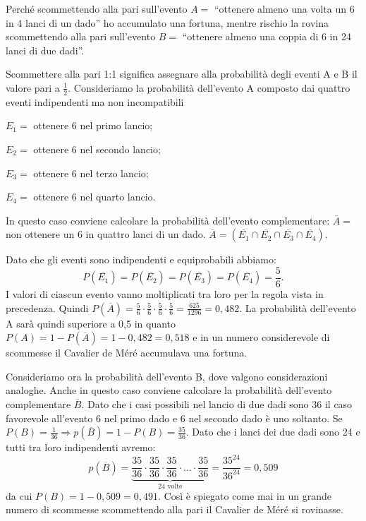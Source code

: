 \begin{problema}
Perché scommettendo alla pari sull'evento $ A= $ ``ottenere almeno una 
volta un 6 in 4 lanci di un dado'' ho accumulato una fortuna, mentre rischio 
la rovina scommettendo alla pari sull'evento $ B= $ ``ottenere almeno una 
coppia di 6 in 24 lanci di due dadi''.
\end{problema}
Scommettere alla pari 1:1 significa assegnare alla probabilità degli eventi 
A e 
B il valore pari a $\frac 1 2$.
Consideriamo la probabilità dell'evento A composto dai quattro eventi 
indipendenti ma non incompatibili
\begin{itemize*}
\item $ E_1= $ ottenere 6 nel primo lancio;
\item $ E_{2}= $ ottenere 6 nel secondo lancio;
\item $ E_{3}= $ ottenere 6 nel terzo lancio;
\item $ E_{4}= $ ottenere 6 nel quarto lancio.
\end{itemize*}
In questo caso conviene calcolare la probabilità dell'evento complementare: 
$\overline A=$ non ottenere un 6 in quattro lanci di un dado.
$\overline A=(\overline{E_1}\cap \overline{E_2}\cap \overline{E_3}\cap 
\overline{E_4})$.

Dato che gli eventi sono indipendenti e equiprobabili abbiamo: \[ 
P(\overline{E_1})=P(\overline{E_2})=P(\overline{E_3})=P(\overline{E_4}
)=\frac 5 
6. \]
I valori di ciascun evento vanno moltiplicati tra loro per la regola vista 
in 
precedenza. Quindi $P(\overline A)=\frac 5 6\cdot \frac 5 6\cdot \frac 5 
6\cdot 
\frac 5 6=\frac{625}{1296}=0,482$.
La probabilità dell'evento A sarà quindi superiore a 0,5 in quanto 
$P(A)=1-P(\overline A)=1-0,482=0,518$ e in un numero considerevole di 
scommesse 
il Cavalier de Méré accumulava una fortuna.

Consideriamo ora la probabilità dell'evento B, dove valgono considerazioni 
analoghe. Anche in questo caso conviene calcolare la probabilità 
dell'evento 
complementare $\overline B$. Dato che i casi possibili nel lancio di due 
dadi 
sono 36 il caso favorevole all'evento 6 nel primo dado e 6 nel secondo dado 
è 
uno soltanto. Se $P(B)=\frac 1{36} \Rightarrow p(\overline 
B)=1-P(B)=\frac{35}{36}$. Dato che i lanci dei due dadi sono 24 e tutti tra 
loro 
indipendenti avremo:
 \[ p(\overline 
B)=\underbrace{\frac{35}{36}\cdot\frac{35}{36}\cdot\frac{35}{36}
\cdot\ldots\cdot\frac{35}{36}}_{24\text{ 
volte}}=\frac{35^{24}}{36^{24}}=0,509 
\]
 da cui $P(B)=1-0,509=0,491$. Così è spiegato come mai in un grande numero 
di 
scommesse scommettendo alla pari il Cavalier de Méré si rovinasse.

